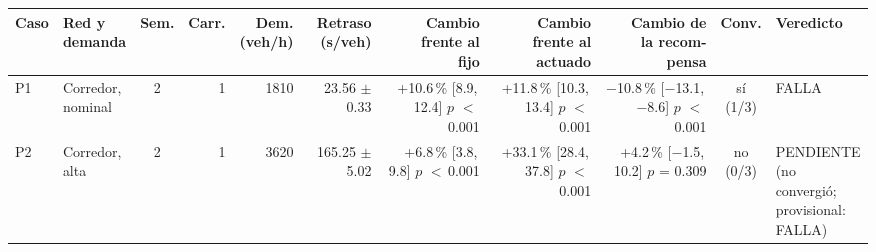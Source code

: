 \begin{table}[H]
\centering
\scriptsize
\setlength{\tabcolsep}{1.5pt}
\begin{tabular}{llcrrrrrrcl}
\toprule
Caso & \makecell[l]{Red y\\demanda} & Sem. & Carr. & \makecell{Dem.\\(veh/h)} & \makecell{Retraso\\(s/veh)} & \makecell{Cambio\\frente al\\fijo} & \makecell{Cambio\\frente al\\actuado} & \makecell{Cambio de\\la recom-\\pensa} & Conv. & Veredicto \\
\midrule
P1 & \makecell[l]{Corredor,\\{}nominal} & 2 & 1 & 1810 & \makecell[r]{23.56\\{}$\pm$ 0.33} & \makecell[r]{+10.6\,\%\\{}[8.9,\,12.4]\\$p$ $<$\,0.001} & \makecell[r]{+11.8\,\%\\{}[10.3,\,13.4]\\$p$ $<$\,0.001} & \makecell[r]{$-$10.8\,\%\\{}[$-$13.1,\,$-$8.6]\\$p$ $<$\,0.001} & \makecell[c]{sí\\{}(1/3)} & FALLA \\
P2 & \makecell[l]{Corredor,\\{}alta} & 2 & 1 & 3620 & \makecell[r]{165.25\\{}$\pm$ 5.02} & \makecell[r]{+6.8\,\%\\{}[3.8,\,9.8]\\$p$ $<$\,0.001} & \makecell[r]{+33.1\,\%\\{}[28.4,\,37.8]\\$p$ $<$\,0.001} & \makecell[r]{+4.2\,\%\\{}[$-$1.5,\,10.2]\\$p$ = 0.309} & \makecell[c]{no\\{}(0/3)} & \makecell[l]{PENDIENTE\\{}(no convergió;\\{}provisional:\\{}FALLA)} \\

\end{tabular}
\end{table}
